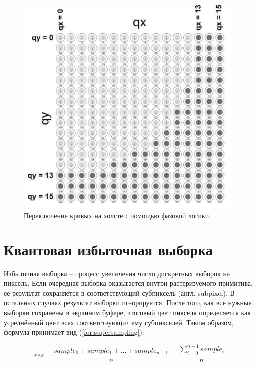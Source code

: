 \begin{figure}[h]
	\begin{center}
		\includegraphics[scale=0.57]{img/holst_03.png}
	\end{center}
	\captionsetup{justification=centering}
	\caption{Переключение кривых на холсте с помощью фазовой логики.}
	\label{for:holst_03}
\end{figure}

\section{Квантовая избыточная выборка}

Избыточная выборка -- процесс увеличения число дискретных выборок на пиксель. Если очередная выборка оказывается внутри растеризуемого примитива, её результат сохраняется в соответствующий субпиксель (англ. subpixel). В остальных случаях результат выборки игнорируется. После того, как все нужные выборки сохранены в экранном буфере, итоговый цвет пикселя определяется как усреднённый цвет всех соответствующих ему субпикселей. Таким образом, формула принимает вид (\ref{for:supersampling}): 

\begin{equation}
	\label{for:supersampling}
	res = \frac{sample_{0} + sample_{1} + ... + sample_{n-1}}{n} = \frac{\sum_{i=0}^{n - 1} sample_{i}}{n}
\end{equation}

